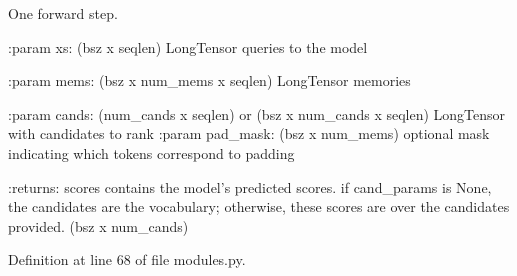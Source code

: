 \begin{DoxyVerb}One forward step.

:param xs:
    (bsz x seqlen) LongTensor queries to the model

:param mems:
    (bsz x num_mems x seqlen) LongTensor memories

:param cands:
    (num_cands x seqlen) or (bsz x num_cands x seqlen)
    LongTensor with candidates to rank
:param pad_mask:
    (bsz x num_mems) optional mask indicating which tokens
    correspond to padding

:returns:
    scores contains the model's predicted scores.
    if cand_params is None, the candidates are the vocabulary;
    otherwise, these scores are over the candidates provided.
    (bsz x num_cands)
\end{DoxyVerb}
 

Definition at line 68 of file modules.\+py.


